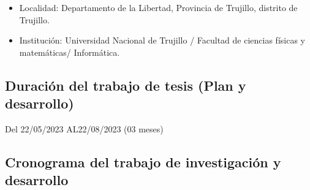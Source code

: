 \documentclass[a4paper, 12pt]{article}
\begin{document}
\begin{itemize}

\item Localidad: 
Departamento de la Libertad, Provincia de Trujillo, distrito de Trujillo.

\item Institución: 
Universidad Nacional de Trujillo / Facultad de ciencias físicas y matemáticas/ Informática.

\end{itemize}

\subsection{Duración del trabajo de tesis (Plan y desarrollo)}
\hspace*{0.7cm}Del \hspace*{0.2cm}22/05/2023 \hspace*{0.3cm} AL\hspace*{0.2cm}22/08/2023  \hspace*{0.2cm}(03 meses)
 
\subsection{Cronograma del trabajo de investigación y desarrollo}
\end{document}
